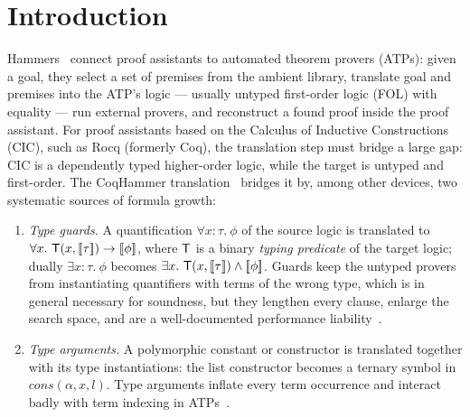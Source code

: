 \section{Introduction}
\label{sec:intro}

Hammers~\cite{BlanchetteKaliszykPaulsonUrban2016} connect proof assistants to
automated theorem provers (ATPs): given a goal, they select a set of premises
from the ambient library, translate goal and premises into the ATP's logic ---
usually untyped first-order logic (FOL) with equality --- run external provers,
and reconstruct a found proof inside the proof assistant.  For proof
assistants based on the Calculus of Inductive Constructions (CIC), such as
Rocq (formerly Coq), the translation step must bridge a large gap: CIC is a
dependently typed higher-order logic, while the target is untyped and
first-order.  The CoqHammer translation~\cite{CzajkaKaliszyk2018,Czajka2018}
bridges it by, among other devices, two systematic sources of formula growth:

\begin{enumerate}[label=(\alph*)]
\item \emph{Type guards.}  A quantification $\forall x{:}\tau.\ \phi$ of the
  source logic is translated to
  $\forall x.\ \mathsf{T}(x, [\![ \tau ]\!]) \rightarrow [\![ \phi ]\!]$, where $\mathsf{T}$ is a binary
  \emph{typing predicate} of the target logic; dually
  $\exists x{:}\tau.\ \phi$ becomes
  $\exists x.\ \mathsf{T}(x,[\![ \tau ]\!]) \wedge [\![ \phi ]\!]$.  Guards keep the untyped
  provers from instantiating quantifiers with terms of the wrong type, which
  is in general necessary for soundness, but they lengthen every clause,
  enlarge the search space, and are a well-documented performance
  liability~\cite{MengPaulson2008,BlanchetteBohmePopescuSmallbone2016,
  ClaessenLilliestromSmallbone2011}.
\item \emph{Type arguments.}  A polymorphic constant or constructor is
  translated together with its type instantiations: the list constructor
  becomes a ternary symbol in $\mathit{cons}(\alpha, x, l)$.  Type arguments
  inflate every term occurrence and interact badly with term indexing in
  ATPs~\cite{MengPaulson2008,BlanchetteBohmePopescuSmallbone2016}.
\end{enumerate}

